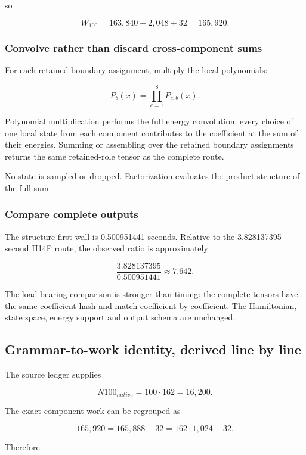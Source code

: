 so

\[
W_{100}=163{,}840+2{,}048+32=165{,}920.
\]

\subsubsection{Convolve rather than discard cross-component
sums}\label{viii-ch01-convolve-rather-than-discard-cross-component-sums}

For each retained boundary assignment, multiply the local polynomials:

\[
P_b(x)=\prod_{c=1}^{8}P_{c,b}(x).
\]

Polynomial multiplication performs the full energy convolution: every
choice of one local state from each component contributes to the
coefficient at the sum of their energies. Summing or assembling over the
retained boundary assignments returns the same retained-role tensor as
the complete route.

No state is sampled or dropped. Factorization evaluates the product
structure of the full sum.

\subsubsection{Compare complete outputs}\label{viii-ch01-compare-complete-outputs}

The structure-first wall is 0.500951441 seconds. Relative to the
3.828137395 second H14F route, the observed ratio is approximately

\[
\frac{3.828137395}{0.500951441}\approx7.642.
\]

The load-bearing comparison is stronger than timing: the complete
tensors have the same coefficient hash and match coefficient by
coefficient. The Hamiltonian, state space, energy support and output
schema are unchanged.

\subsection{Grammar-to-work identity, derived line by
line}\label{viii-ch01-grammar-to-work-identity-derived-line-by-line}

The source ledger supplies

\[
N100_{native}=100\cdot162=16{,}200.
\]

The exact component work can be regrouped as

\[
165{,}920=165{,}888+32=162\cdot1{,}024+32.
\]

Therefore


